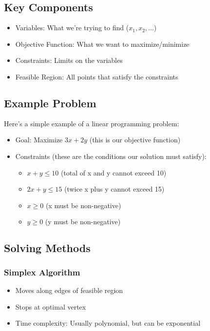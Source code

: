 \documentclass[11pt,a4paper]{article}
\begin{document}
\begin{multicols}{2}
\subsection{Key Components}
\begin{itemize}
    \item Variables: What we're trying to find ($x_1, x_2, ...$)
    \item Objective Function: What we want to maximize/minimize
    \item Constraints: Limits on the variables
    \item Feasible Region: All points that satisfy the constraints
\end{itemize}

\subsection{Example Problem}
Here's a simple example of a linear programming problem:
\begin{itemize}
    \item Goal: Maximize $3x + 2y$ (this is our objective function)
    \item Constraints (these are the conditions our solution must satisfy):
    \begin{itemize}
        \item $x + y \leq 10$ (total of x and y cannot exceed 10)
        \item $2x + y \leq 15$ (twice x plus y cannot exceed 15)
        \item $x \geq 0$ (x must be non-negative)
        \item $y \geq 0$ (y must be non-negative)
    \end{itemize}
\end{itemize}

\subsection{Solving Methods}
\subsubsection{Simplex Algorithm}
\begin{itemize}
    \item Moves along edges of feasible region
    \item Stops at optimal vertex
    \item Time complexity: Usually polynomial, but can be exponential
\end{itemize}


\end{multicols}
\end{document}
